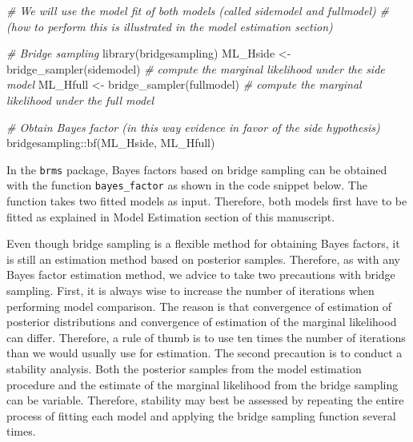 \documentclass[
  english,
  doc,floatsintext]{apa6}
\newenvironment{Shaded}{\begin{snugshade}}{\end{snugshade}}
\newcommand{\CommentTok}[1]{\textcolor[rgb]{0.56,0.35,0.01}{\textit{#1}}}
\newcommand{\FunctionTok}[1]{\textcolor[rgb]{0.00,0.00,0.00}{#1}}
\newcommand{\NormalTok}[1]{#1}
\newcommand{\OtherTok}[1]{\textcolor[rgb]{0.56,0.35,0.01}{#1}}
\newcommand{\SpecialCharTok}[1]{\textcolor[rgb]{0.00,0.00,0.00}{#1}}
\begin{document}
\scriptsize

\begin{Shaded}
\begin{Highlighting}[]
\CommentTok{\# We will use the model fit of both models (called sidemodel and fullmodel)}
\CommentTok{\# (how to perform this is illustrated in the model estimation section)}

\CommentTok{\# Bridge sampling }
\FunctionTok{library}\NormalTok{(bridgesampling)}
\NormalTok{ML\_Hside }\OtherTok{\textless{}{-}} \FunctionTok{bridge\_sampler}\NormalTok{(sidemodel)  }\CommentTok{\# compute the marginal likelihood under the side model }
\NormalTok{ML\_Hfull }\OtherTok{\textless{}{-}} \FunctionTok{bridge\_sampler}\NormalTok{(fullmodel)  }\CommentTok{\# compute the marginal likelihood under the full model }

\CommentTok{\# Obtain Bayes factor (in this way evidence in favor of the side hypothesis)}
\NormalTok{bridgesampling}\SpecialCharTok{::}\FunctionTok{bf}\NormalTok{(ML\_Hside, ML\_Hfull)}
\end{Highlighting}
\end{Shaded}

\normalsize

In the \texttt{brms} package, Bayes factors based on bridge sampling can be obtained with the function \texttt{bayes\_factor} as shown in the code snippet below. The function takes two fitted models as input. Therefore, both models first have to be fitted as explained in Model Estimation section of this manuscript.

\scriptsize

\begin{Shaded}
\end{Shaded}

\normalsize

Even though bridge sampling is a flexible method for obtaining Bayes factors, it is still an estimation method based on posterior samples. Therefore, as with any Bayes factor estimation method, we advice to take two precautions with bridge sampling. First, it is always wise to increase the number of iterations when performing model comparison. The reason is that convergence of estimation of posterior distributions and convergence of estimation of the marginal likelihood can differ. Therefore, a rule of thumb is to use ten times the number of iterations than we would usually use for estimation. The second precaution is to conduct a stability analysis. Both the posterior samples from the model estimation procedure and the estimate of the marginal likelihood from the bridge sampling can be variable. Therefore, stability may best be assessed by repeating the entire process of fitting each model and applying the bridge sampling function several times.
\end{document}
